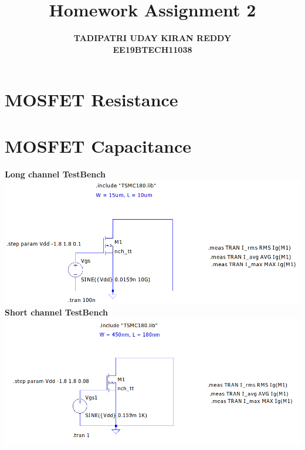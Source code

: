 \documentclass{article}
\begin{document}
\title{\textbf{Homework Assignment 2}}
\author{\textbf{TADIPATRI UDAY KIRAN REDDY}\\\textbf{EE19BTECH11038}}
\maketitle
\section{\textbf{MOSFET Resistance}}

\section{\textbf{MOSFET Capacitance}}
\textbf{Long channel TestBench}\\
\includegraphics[scale=0.4]{./figs/Q2_nmos_lc_tb.png}\\
 \newline
\textbf{Short channel TestBench}\\
\includegraphics[scale=0.4]{./figs/Q2_nmos_sc_tb.png}\\
\end{document}
